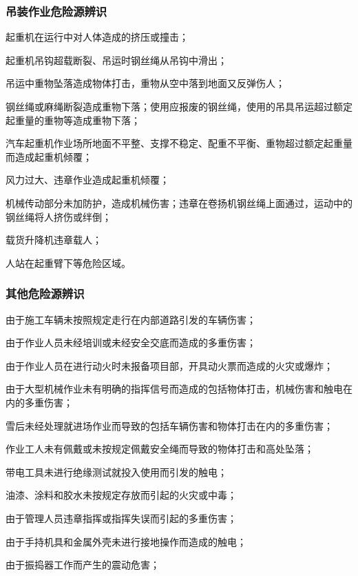 \subsubsection{吊装作业危险源辨识}

 起重机在运行中对人体造成的挤压或撞击；

 起重机吊钩超载断裂、吊运时钢丝绳从吊钩中滑出；

 吊运中重物坠落造成物体打击，重物从空中落到地面又反弹伤人；

 钢丝绳或麻绳断裂造成重物下落；使用应报废的钢丝绳，使用的吊具吊运超过额定起重量的重物等造成重物下落；

 汽车起重机作业场所地面不平整、支撑不稳定、配重不平衡、重物超过额定起重量而造成起重机倾覆；

 风力过大、违章作业造成起重机倾覆；

 机械传动部分未加防护，造成机械伤害；违章在卷扬机钢丝绳上面通过，运动中的钢丝绳将人挤伤或绊倒；

 载货升降机违章载人；

 人站在起重臂下等危险区域。

\subsubsection{其他危险源辨识}

 由于施工车辆未按照规定走行在内部道路引发的车辆伤害；

 由于作业人员未经培训或未经安全交底而造成的多重伤害；

 由于作业人员在进行动火时未报备项目部，开具动火票而造成的火灾或爆炸；

 由于大型机械作业未有明确的指挥信号而造成的包括物体打击，机械伤害和触电在内的多重伤害；

 雪后未经处理就进场作业而导致的包括车辆伤害和物体打击在内的多重伤害；

 作业工人未有佩戴或未按规定佩戴安全绳而导致的物体打击和高处坠落；

 带电工具未进行绝缘测试就投入使用而引发的触电；

 油漆、涂料和胶水未按规定存放而引起的火灾或中毒；

 由于管理人员违章指挥或指挥失误而引起的多重伤害；

 由于手持机具和金属外壳未进行接地操作而造成的触电；

 由于振捣器工作而产生的震动危害；

